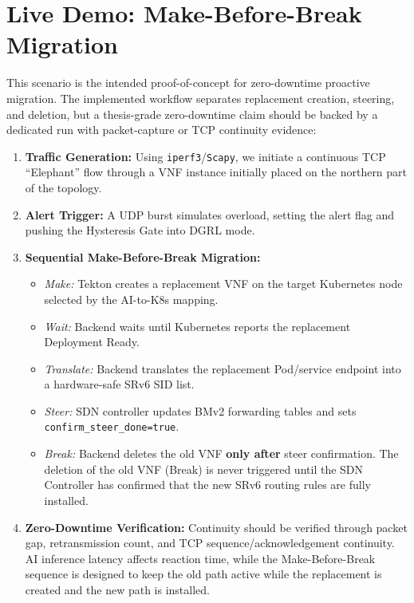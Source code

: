 \documentclass[12pt, a4paper, reqno, oneside]{book}
\begin{document}
\section{Live Demo: Make-Before-Break Migration}
This scenario is the intended proof-of-concept for zero-downtime proactive migration. The implemented workflow separates replacement creation, steering, and deletion, but a thesis-grade zero-downtime claim should be backed by a dedicated run with packet-capture or TCP continuity evidence:
\begin{enumerate}
    \item \textbf{Traffic Generation:} Using \texttt{iperf3}/\texttt{Scapy}, we initiate a continuous TCP ``Elephant'' flow through a VNF instance initially placed on the northern part of the topology.
    \item \textbf{Alert Trigger:} A UDP burst simulates overload, setting the alert flag and pushing the Hysteresis Gate into DGRL mode.
    \item \textbf{Sequential Make-Before-Break Migration:}
    \begin{itemize}
        \item \textit{Make:} Tekton creates a replacement VNF on the target Kubernetes node selected by the AI-to-K8s mapping.
        \item \textit{Wait:} Backend waits until Kubernetes reports the replacement Deployment Ready.
        \item \textit{Translate:} Backend translates the replacement Pod/service endpoint into a hardware-safe SRv6 SID list.
        \item \textit{Steer:} SDN controller updates BMv2 forwarding tables and sets \texttt{confirm\_steer\_done=true}.
        \item \textit{Break:} Backend deletes the old VNF \textbf{only after} steer confirmation. The deletion of the old VNF (Break) is never triggered until the SDN Controller has confirmed that the new SRv6 routing rules are fully installed.
    \end{itemize}
    \item \textbf{Zero-Downtime Verification:} Continuity should be verified through packet gap, retransmission count, and TCP sequence/acknowledgement continuity. AI inference latency affects reaction time, while the Make-Before-Break sequence is designed to keep the old path active while the replacement is created and the new path is installed.
\end{enumerate}
\end{document}
